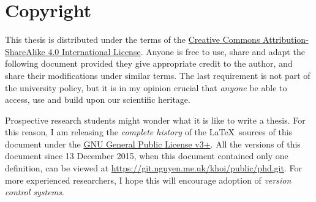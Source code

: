 \chapter*{Copyright}

This thesis is distributed under the terms of the
\href{http://creativecommons.org/licenses/by-sa/4.0/}{Creative Commons Attribution-ShareAlike 4.0 International License}.
Anyone is free to use, share and adapt the following document
provided they give appropriate credit to the author,
and share their modifications under similar terms.
The last requirement is not part of the university policy,
but it is in my opinion crucial that \emph{anyone} be able to access, use and build upon our scientific heritage.

Prospective research students might wonder what it is like to write a thesis.
For this reason, I am releasing the \emph{complete history} of the \LaTeX\ sources of this document
under the \href{https://www.gnu.org/licenses/gpl.html}{GNU General Public License v3+}.
All the versions of this document since 13 December 2015,
when this document contained only one definition,
can be viewed at
\url{https://git.nguyen.me.uk/khoi/public/phd.git}.
For more experienced researchers, I hope this will encourage adoption of \emph{version control systems}.
